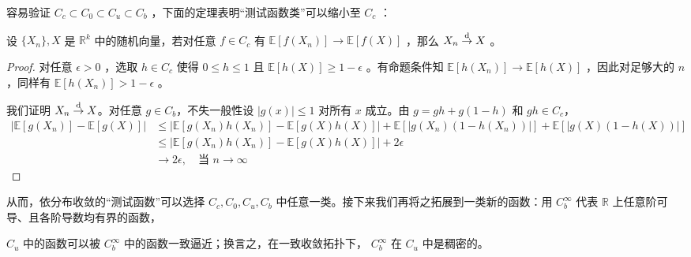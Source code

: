 容易验证 $C_c\subset C_0\subset C_u\subset C_b$ ，下面的定理表明``测试函数类''可以缩小至 $C_c$ ：

\begin{lemma}

\label{lem:ch3:3-5}设 $\{X_n\},X$ 是 $\mathbb R^k$ 中的随机向量，若对任意 $f\in C_c$ 有 $\mathbb{E}[f(X_n)]\to \mathbb{E}[f(X)]$ ，那么 $X_n\overset{\rm d}\to X$ 。

\end{lemma}

\begin{proof}

对任意 $\epsilon>0$ ，选取 $h\in C_c$ 使得 $0\le h\le 1$ 且 $\mathbb{E}[h(X)]\ge 1-\epsilon$ 。有命题条件知 $\mathbb{E}[h(X_n)]\to\mathbb{E}[h(X)]$ ，因此对足够大的 $n$ ，同样有 $\mathbb{E}[h(X_n)]>1-\epsilon$ 。

我们证明 $X_n\overset{\rm d}\to X$。对任意 $g\in C_b$，不失一般性设 $|g(x)|\le 1$ 对所有 $x$ 成立。由 $g=gh+g(1-h)$ 和 $gh\in C_c$，
\[\begin{aligned} |\mathbb{E}[g(X_n)]-\mathbb{E}[g(X)]|&\le |\mathbb{E}[g(X_n)h(X_n)]-\mathbb{E}[g(X)h(X)]|+\mathbb{E}[|g(X_n)(1-h(X_n))|]+\mathbb{E}[|g(X)(1-h(X))|]\\ &\le |\mathbb{E}[g(X_n)h(X_n)]-\mathbb{E}[g(X)h(X)]|+2\epsilon\\ &\to 2\epsilon,\quad \text{当 }n\to\infty \end{aligned}\]
\end{proof}

从而，依分布收敛的``测试函数''可以选择 $C_c,C_0,C_u,C_b$ 中任意一类。接下来我们再将之拓展到一类新的函数：用 $C_b^\infty$ 代表 $\mathbb R$ 上任意阶可导、且各阶导数均有界的函数，

\begin{lemma}

\label{lem:ch3:3-6}$C_u$ 中的函数可以被 $C_b^\infty$ 中的函数一致逼近；换言之，在一致收敛拓扑下， $C_b^\infty$ 在 $C_u$ 中是稠密的。

\end{lemma}

